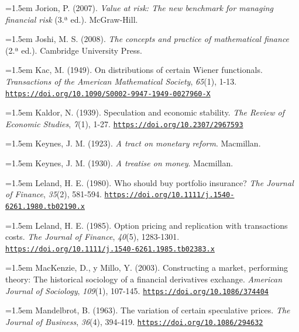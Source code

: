 \documentclass[10pt,a4paper]{article}
\begin{document}
\noindent\hangindent=1.5em Jorion, P. (2007). \textit{Value at risk: The new benchmark for managing financial risk} (3.ª ed.). McGraw-Hill.

\noindent\hangindent=1.5em Joshi, M. S. (2008). \textit{The concepts and practice of mathematical finance} (2.ª ed.). Cambridge University Press.

\noindent\hangindent=1.5em Kac, M. (1949). On distributions of certain Wiener functionals. \textit{Transactions of the American Mathematical Society}, \textit{65}(1), 1-13. \href{https://doi.org/10.1090/S0002-9947-1949-0027960-X}{\nolinkurl{https://doi.org/10.1090/S0002-9947-1949-0027960-X}}

\noindent\hangindent=1.5em Kaldor, N. (1939). Speculation and economic stability. \textit{The Review of Economic Studies}, \textit{7}(1), 1-27. \href{https://doi.org/10.2307/2967593}{\nolinkurl{https://doi.org/10.2307/2967593}}

\noindent\hangindent=1.5em Keynes, J. M. (1923). \textit{A tract on monetary reform}. Macmillan.

\noindent\hangindent=1.5em Keynes, J. M. (1930). \textit{A treatise on money}. Macmillan.

\noindent\hangindent=1.5em Leland, H. E. (1980). Who should buy portfolio insurance? \textit{The Journal of Finance}, \textit{35}(2), 581-594. \href{https://doi.org/10.1111/j.1540-6261.1980.tb02190.x}{\nolinkurl{https://doi.org/10.1111/j.1540-6261.1980.tb02190.x}}

\noindent\hangindent=1.5em Leland, H. E. (1985). Option pricing and replication with transactions costs. \textit{The Journal of Finance}, \textit{40}(5), 1283-1301. \href{https://doi.org/10.1111/j.1540-6261.1985.tb02383.x}{\nolinkurl{https://doi.org/10.1111/j.1540-6261.1985.tb02383.x}}

\noindent\hangindent=1.5em MacKenzie, D., y Millo, Y. (2003). Constructing a market, performing theory: The historical sociology of a financial derivatives exchange. \textit{American Journal of Sociology}, \textit{109}(1), 107-145. \href{https://doi.org/10.1086/374404}{\nolinkurl{https://doi.org/10.1086/374404}}

\noindent\hangindent=1.5em Mandelbrot, B. (1963). The variation of certain speculative prices. \textit{The Journal of Business}, \textit{36}(4), 394-419. \href{https://doi.org/10.1086/294632}{\nolinkurl{https://doi.org/10.1086/294632}}
\end{document}
